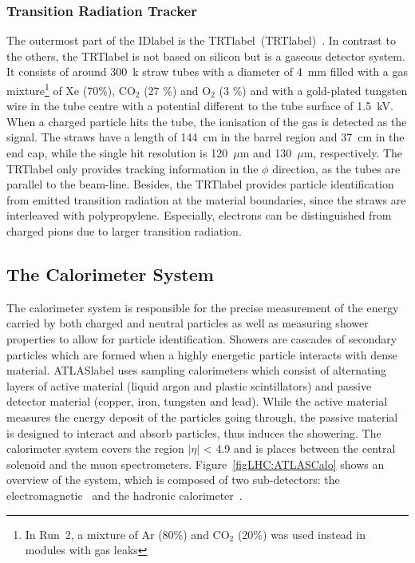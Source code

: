 \subsubsection*{Transition Radiation Tracker}

The outermost part of the \acrshort{IDlabel} is the \acrlong{TRTlabel}~(\acrshort{TRTlabel})~\cite{MITSOU_2004,TRTRun1}. In contrast to the others, the \acrshort{TRTlabel} is not based on silicon but is a gaseous detector system. It consists of around 300~k straw tubes with a diameter of 4~mm filled with a gas mixture\footnote{In Run~2, a mixture of Ar (80\%) and CO$_2$ (20\%) was used instead in modules with gas leaks} of Xe (70\%), CO$_2$ (27 \%) and O$_2$ (3 \%) and with a gold-plated tungsten wire in the tube centre with a potential different to the tube surface of 1.5~kV. When a charged particle hits the tube, the ionisation of the gas is detected as the signal. The straws have a length of 144~cm in the barrel region and 37~cm in the end cap, while the single hit resolution is 120~$\mu$m and 130~$\mu$m, respectively. The \acrshort{TRTlabel} only provides tracking information in the $\phi$ direction, as the tubes are parallel to the beam-line. Besides, the \acrshort{TRTlabel} provides particle identification from emitted transition radiation at the material boundaries, since the straws are interleaved with polypropylene. Especially, electrons can be distinguished from charged pions due to larger transition radiation.


\subsection{The Calorimeter System}

The calorimeter system is responsible for the precise measurement of the energy carried by both charged and neutral particles as well as measuring shower properties to allow for particle identification. Showers are cascades of secondary particles which are formed when a highly energetic particle interacts with dense material. \acrshort{ATLASlabel} uses sampling calorimeters which consist of alternating layers of active material (liquid argon and plastic scintillators) and passive detector material (copper, iron, tungsten and lead). While the active material measures the energy deposit of the particles going through, the passive material is designed to interact and absorb particles, thus induces the showering. The calorimeter system covers the region $|\eta|$ < 4.9 and is places between the central solenoid and the muon spectrometers. Figure~\ref{figLHC:ATLASCalo} shows an overview of the system, which is composed of two sub-detectors: the electromagnetic~\cite{CERN-LHCC-96-041,CERN-LHCC-2017-018} and the hadronic calorimeter~\cite{CERN-LHCC-96-042}. 

